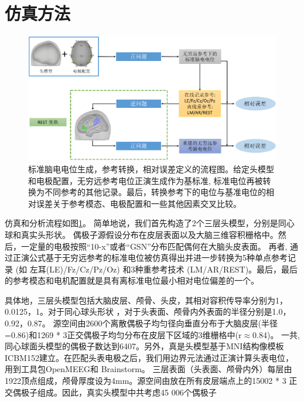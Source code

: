 \section{仿真方法}
\begin{figure}%
	\centering
	\includegraphics[width=15cm]{pic/JNE/figure1.png}
	\caption{标准脑电电位生成，参考转换，相对误差定义的流程图。给定头模型和电极配置，无穷远参考电位正演生成作为基标准, 标准电位再被转换为不同参考的其他记录。最后，转换参考下的电位与基准电位的相对误差关于参考模态、电极配置和一些其他因素交叉比较。}
	\label{2.1}
\end{figure}
仿真和分析流程如图\ref{2.1}。 简单地说，我们首先构造了2个三层头模型，分别是同心球和真实头形状。 偶极子源假设分布在皮层表面以及大脑三维容积栅格中。然后，一定量的电极按照“10-x”或者“GSN”分布匹配偶何在大脑头皮表面。 再者, 通过正演公式基于无穷远参考的标准电位被仿真得出并进一步转换为5种单点参考记录 (如 左耳(LE)/Fz/Cz/Pz/Oz) 和3种重参考技术 (LM/AR/REST)。最后，最后的参考模态和电机配置就是具有离标准电位最小相对电位偏差的一个。

具体地，三层头模型包括大脑皮层、颅骨、头皮，其相对容积传导率分别为1，0.0125，1。对于同心球头形状 ，对于头表面、颅骨内外表面的半径分别是1.0，0.92，0.87。 源空间由2600个离散偶极子均匀径向垂直分布于大脑皮层(半径=0.86)和1269 * 3正交偶极子均匀分布在皮层下区域的3维栅格中(r$\approx$0.84)。 一共,同心球面头模型的偶极子数达到6407。另外，真是头模型基于MNI结构像模板ICBM152建立。在匹配头表电极之后，我们用边界元法通过正演计算头表电位，用到工具包OpenMEEG和 Brainstorm。 三层表面（头表面、颅骨内外）每层由1922顶点组成，颅骨厚度设为4mm。源空间由放在所有皮层端点上的15002 * 3 正交偶极子组成。因此，真实头模型中共考虑45 006个偶极子

